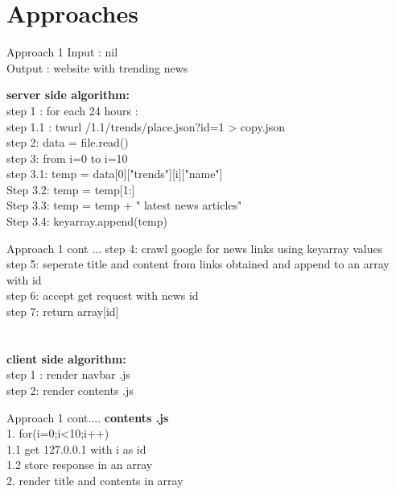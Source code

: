 \documentclass{beamer}
\begin{document}
	\section{Approaches}
	\begin{frame}{Approach 1}
		\footnotesize
	\Large{Input : nil \\
	Output :  website with trending news}
	
	\footnotesize
	\textbf{\Large{server side algorithm: }}\\
\Large{	step 1 :  for each 24 hours : \\
	\hspace{.2cm} step 1.1 : twurl /1.1/trends/place.json?id=1 > copy.json\\
	step 2:  data = file.read() \\
	step 3:  from i=0 to i=10 \\
	\hspace{.2cm}step 3.1: temp = data[0]["trends"][i]["name"]\\   
	\hspace{.2cm}Step 3.2:  temp = temp[1:]  \\
\hspace{.2cm}Step 3.3:  temp = temp + " latest news articles"\\
\hspace{.2cm}Step 3.4:  keyarray.append(temp)  \\
 }
		
	\end{frame}
	\begin{frame}{Approach 1 cont ...}
    \Large{	
    step 4: crawl google for news links using keyarray values\\
    step 5: seperate title and content from links obtained  and append to an array with id \\
    step 6: accept get request with news id\\
    step 7: return array[id]\\   }
    \\
    \\
	\footnotesize
	\textbf{\Large{client side algorithm: }}\\
	\Large{step 1 : render  navbar .js  \\	
	step 2:  render  contents .js \\}
	
	
  
\end{frame}
\begin{frame}{Approach 1 cont....}
    \Large{\vspace{5mm}
	\textbf{contents .js}\\
	\vspace{5mm}
	1. for(i=0;i<10;i++)\\
	\hspace{.2cm}1.1 get 127.0.0.1 with i as id\\
	\hspace{.2cm}1.2 store response in an array\\
	2. render title and contents in array}
    
\end{frame}
\end{document}
